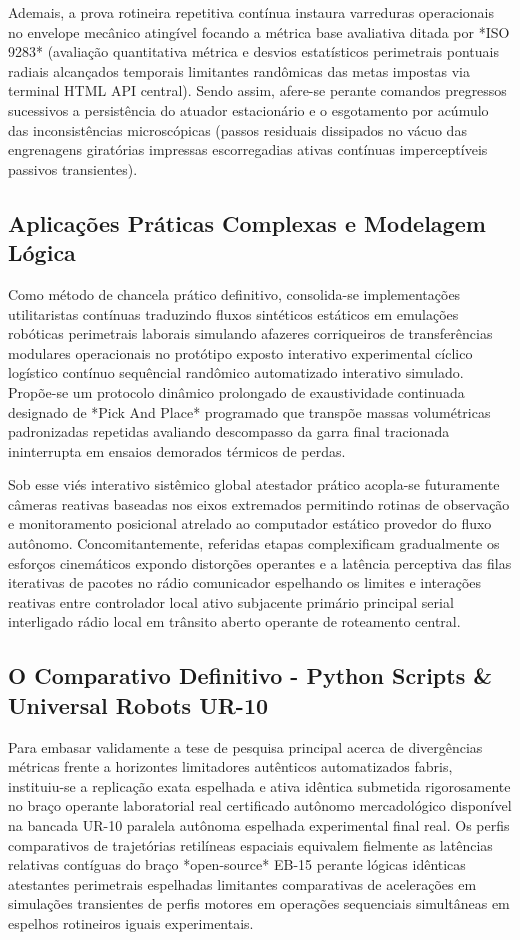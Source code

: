 Ademais, a prova rotineira repetitiva contínua instaura varreduras operacionais no envelope mecânico atingível focando a métrica base avaliativa ditada por *ISO 9283* (avaliação quantitativa métrica e desvios estatísticos perimetrais pontuais radiais alcançados temporais limitantes randômicas das metas impostas via terminal HTML API central). Sendo assim, afere-se perante comandos pregressos sucessivos a persistência do atuador estacionário e o esgotamento por acúmulo das inconsistências microscópicas (passos residuais dissipados no vácuo das engrenagens giratórias impressas escorregadias ativas contínuas imperceptíveis passivos transientes).

\subsection{Aplicações Práticas Complexas e Modelagem Lógica}

Como método de chancela prático definitivo, consolida-se implementações utilitaristas contínuas traduzindo fluxos sintéticos estáticos em emulações robóticas perimetrais laborais simulando afazeres corriqueiros de transferências modulares operacionais no protótipo exposto interativo experimental cíclico logístico contínuo sequêncial randômico automatizado interativo simulado. Propõe-se um protocolo dinâmico prolongado de exaustividade continuada designado de *Pick And Place* programado que transpõe massas volumétricas padronizadas repetidas avaliando descompasso da garra final tracionada ininterrupta em ensaios demorados térmicos de perdas.

Sob esse viés interativo sistêmico global atestador prático acopla-se futuramente câmeras reativas baseadas nos eixos extremados permitindo rotinas de observação e monitoramento posicional atrelado ao computador estático provedor do fluxo autônomo. Concomitantemente, referidas etapas complexificam gradualmente os esforços cinemáticos expondo distorções operantes e a latência perceptiva das filas iterativas de pacotes no rádio comunicador espelhando os limites e interações reativas entre controlador local ativo subjacente primário principal serial interligado rádio local em trânsito aberto operante de roteamento central.

\subsection{O Comparativo Definitivo - Python Scripts \& Universal Robots UR-10}

Para embasar validamente a tese de pesquisa principal acerca de divergências métricas frente a horizontes limitadores autênticos automatizados fabris, instituiu-se a replicação exata espelhada e ativa idêntica submetida rigorosamente no braço operante laboratorial real certificado autônomo mercadológico disponível na bancada UR-10 paralela autônoma espelhada experimental final real. Os perfis comparativos de trajetórias retilíneas espaciais equivalem fielmente as latências relativas contíguas do braço *open-source* EB-15 perante lógicas idênticas atestantes perimetrais espelhadas limitantes comparativas de acelerações em simulações transientes de perfis motores em operações sequenciais simultâneas em espelhos rotineiros iguais experimentais.

